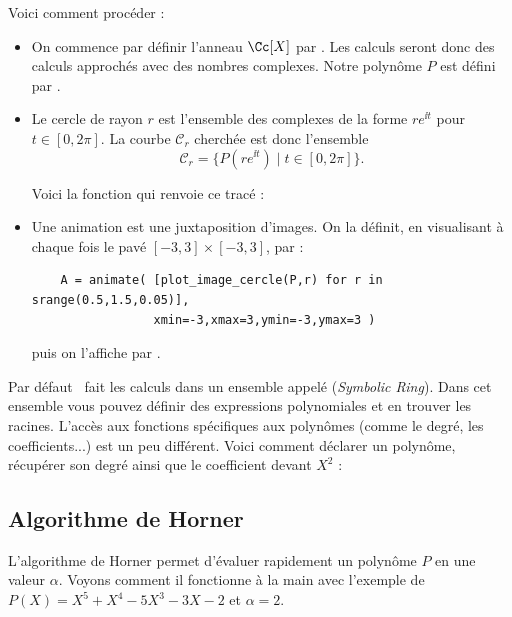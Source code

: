 \documentclass[class=report,crop=false]{standalone}
\begin{document}
Voici comment procéder :
\begin{itemize}
  \item On commence par définir l'anneau $\Cc[X]$ par .
  Les calculs seront donc des calculs approchés avec des nombres complexes.
  Notre polynôme $P$ est défini par .
  
  \item 
  Le cercle de rayon $r$ est l'ensemble des complexes de la forme $re^{\ii t}$ pour $t\in [0,2\pi]$.
  La courbe $\mathcal{C}_r$ cherchée est donc l'ensemble 
  $$\mathcal{C}_r = \big\{ P(re^{\ii t}) \mid t \in  [0,2\pi] \big\}.$$
  
  Voici la fonction qui renvoie ce tracé :
  
  \item Une animation est une juxtaposition d'images. 
  On la définit, en visualisant à chaque fois le pavé $[-3,3]\times[-3,3]$, par :
  \begin{lstlisting}
    A = animate( [plot_image_cercle(P,r) for r in srange(0.5,1.5,0.05)],
                 xmin=-3,xmax=3,ymin=-3,ymax=3 )
\end{lstlisting}
  puis on l'affiche par .
\end{itemize}

\begin{remarque*}
Par défaut \Sage\ fait les calculs dans un ensemble appelé  (\emph{Symbolic Ring}).
Dans cet ensemble vous pouvez définir des expressions polynomiales et en trouver les racines.
L'accès aux fonctions spécifiques aux polynômes (comme le degré, les coefficients...) est un peu différent. 
Voici comment déclarer un polynôme, récupérer son degré ainsi que le coefficient devant $X^2$ :
\end{remarque*}


\subsection{Algorithme de Horner}

L'algorithme de Horner permet d'évaluer rapidement un polynôme $P$ en une valeur $\alpha$.
Voyons comment il fonctionne à la main avec l'exemple de $P(X) = X^5 + X^4 - 5X^3 - 3X - 2$
et $\alpha = 2$.
\end{document}
